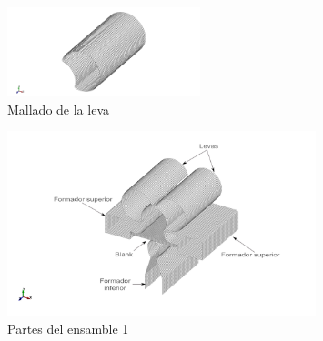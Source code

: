 \begin{figure}[!h]
\centering
\includegraphics[width=0.5\textwidth]{src/ch3/mesh_leva.png}
\caption{Mallado de la leva}
\label{fig:mesh_fi}
\end{figure}





\begin{figure}[!h]
\centering
\includegraphics[width=0.8\textwidth]{src/ch3/parts_01.pdf}
\caption{Partes del ensamble 1}
\label{fig:parts_01}
\end{figure}


